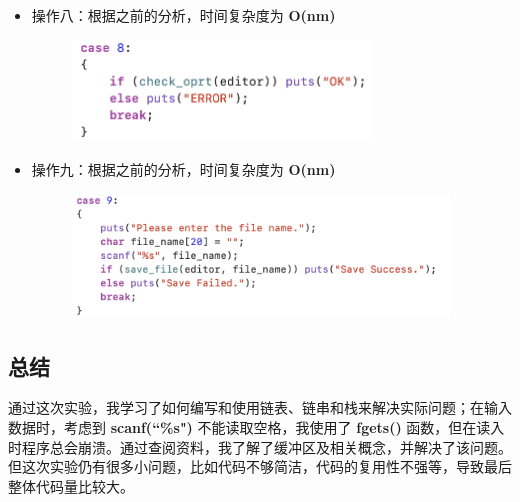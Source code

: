 \begin{itemize}
\begin{figure}[htbp]
            \end{figure}
            \item 操作八：根据之前的分析，时间复杂度为 \textbf{O(nm)}
            \begin{figure}[htbp]
                \includegraphics[width = 8cm]{cs_8.png}
            \end{figure}
            \newpage
            \item 操作九：根据之前的分析，时间复杂度为 \textbf{O(nm)}
            \begin{figure}[htbp]
                \includegraphics[width = 10cm]{cs_9.png}
            \end{figure}
        \end{itemize}
    \subsection{总结}
        \par 通过这次实验，我学习了如何编写和使用链表、链串和栈来解决实际问题；在输入数据时，考虑到 \textbf{scanf(``\%s")} 不能读取空格，我使用了 \textbf{fgets()} 函数，但在读入时程序总会崩溃。通过查阅资料，我了解了缓冲区及相关概念，并解决了该问题。但这次实验仍有很多小问题，比如代码不够简洁，代码的复用性不强等，导致最后整体代码量比较大。
